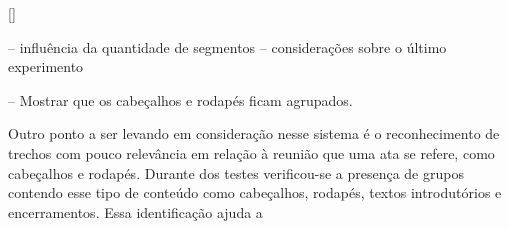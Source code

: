 




\ref{}
































-- influência da quantidade de segmentos
-- considerações sobre o último experimento


-- Mostrar que os cabeçalhos e rodapés ficam agrupados.


Outro ponto a ser levando em consideração nesse sistema é o reconhecimento de trechos com pouco relevância em relação à reunião que uma ata se refere, como cabeçalhos e rodapés. Durante dos testes verificou-se a presença de grupos contendo esse tipo de conteúdo como cabeçalhos, rodapés, textos introdutórios e encerramentos. Essa identificação ajuda a 







